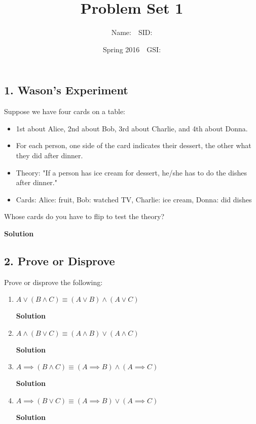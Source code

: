 \documentclass{article}
\title{Problem Set 1}
\author{Name:$\quad$SID: }
\date{Spring 2016$\quad$GSI: }
\begin{document}
\maketitle

\subsection*{1. Wason's Experiment}
Suppose we have four cards on a table: \begin{itemize}
  \setlength\itemsep{0em}
  \item 1st about Alice, 2nd about Bob, 3rd about Charlie, and 4th about Donna.
  \item For each person, one side of the card indicates their dessert, the other what they did after dinner.
  \item Theory: "If a person has ice cream for dessert, he/she has to do the dishes after dinner."
  \item Cards: Alice: fruit, Bob: watched TV, Charlie: ice cream, Donna: did dishes
\end{itemize}
Whose cards do you have to flip to test the theory?
\begin{mdframed} 
\textbf{Solution}

\end{mdframed}

\subsection*{2. Prove or Disprove}
Prove or disprove the following:\begin{enumerate}
\item  $A\lor(B\land C)\equiv(A\lor B)\land (A\lor C)$
\begin{mdframed}
\textbf{Solution}

\end{mdframed}
\item  $A\land(B\lor C)\equiv (A\land B)\lor (A\land C)$
\begin{mdframed}
\textbf{Solution}
\end{mdframed}
\item $A\implies (B\land C)\equiv (A\implies B)\land (A\implies C)$
\begin{mdframed}
\textbf{Solution}
\end{mdframed}
\item $A\implies (B\lor C)\equiv (A\implies B)\lor (A\implies C)$
\begin{mdframed}
\textbf{Solution}
\end{mdframed}
\end{enumerate}
\end{document}

